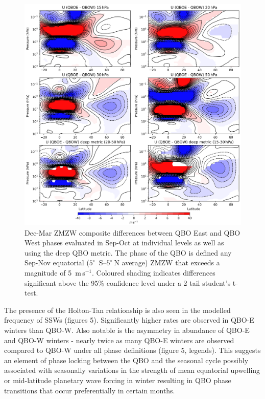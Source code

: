 \begin{figure}[h!]
\begin{center}
\noindent\includegraphics[width = 0.85\linewidth]{Figures/Figures-origins/holton_tan_composites.png}
\caption[ZMZW composite differences between QBO phases in UKESM pi-control.]{Dec-Mar ZMZW composite differences between QBO East and QBO West phases evaluated in Sep-Oct at individual levels as well as using the deep QBO metric. The phase of the QBO is defined any Sep-Nov equatorial ($5^{\circ}$\ S--$5^{\circ}\ $N average) ZMZW that exceeds a magnitude of 5\ m\,s$^{-1}$. Coloured shading indicates differences significant above the 95\% confidence level under a 2 tail student’s t-test.}
\label{fig:holton_tan_comp}
\end{center}
\end{figure}

The presence of the Holton-Tan relationship is also seen in the modelled frequency of SSWs (figures 5). Significantly higher rates are observed in QBO-E winters than QBO-W. Also notable is the asymmetry in abundance of QBO-E and QBO-W winters - nearly twice as many QBO-E winters are observed compared to QBO-W under all phase definitions (figure 5, legends). This suggests an element of phase locking between the QBO and the seasonal cycle possibly associated with seasonally variations in the strength of mean equatorial upwelling or mid-latitude planetary wave forcing in winter \citep{pascoeQuasibiennial2005b, gruzdevTwo2000b, rajendranSynchronisation2016b} resulting in QBO phase transitions that occur preferentially in certain months. 

